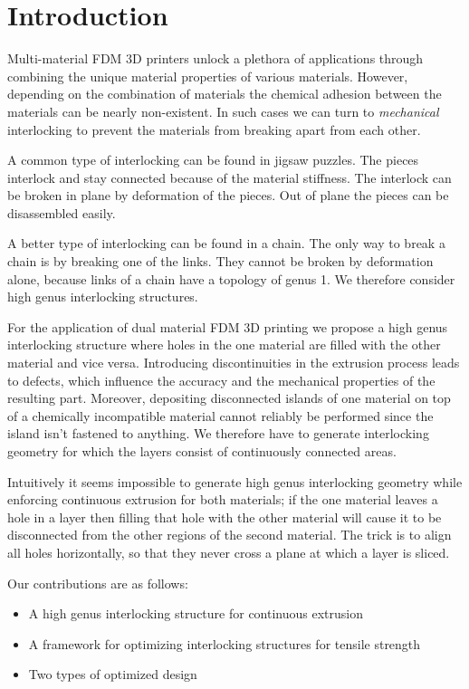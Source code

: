 \section{Introduction}
Multi-material FDM 3D printers unlock a plethora of applications through combining the unique material properties of various materials.
However, depending on the combination of materials the chemical adhesion between the materials can be nearly non-existent.
In such cases we can turn to \emph{mechanical} interlocking to prevent the materials from breaking apart from each other.

A common type of interlocking can be found in jigsaw puzzles.
The pieces interlock and stay connected because of the material stiffness.
The interlock can be broken in plane by deformation of the pieces.
Out of plane the pieces can be disassembled easily.

A better type of interlocking can be found in a chain.
The only way to break a chain is by breaking one of the links.
They cannot be broken by deformation alone, because links of a chain have a topology of genus 1.
We therefore consider high genus interlocking structures.

For the application of dual material FDM 3D printing we propose a high genus interlocking structure where holes in the one material are filled with the other material and vice versa.
Introducing discontinuities in the extrusion process leads to defects, which influence the accuracy and the mechanical properties of the resulting part.
Moreover, depositing disconnected islands of one material on top of a chemically incompatible material cannot reliably be performed since the island isn't fastened to anything.
We therefore have to generate interlocking geometry for which the layers consist of continuously connected areas.

Intuitively it seems impossible to generate high genus interlocking geometry while enforcing continuous extrusion for both materials;
if the one material leaves a hole in a layer then filling that hole with the other material will cause it to be disconnected from the other regions of the second material.
The trick is to align all holes horizontally, so that they never cross a plane at which a layer is sliced.



Our contributions are as follows:
\begin{itemize}
	\item A high genus interlocking structure for continuous extrusion
	\item A framework for optimizing interlocking structures for tensile strength
	\item Two types of optimized design
\end{itemize}










